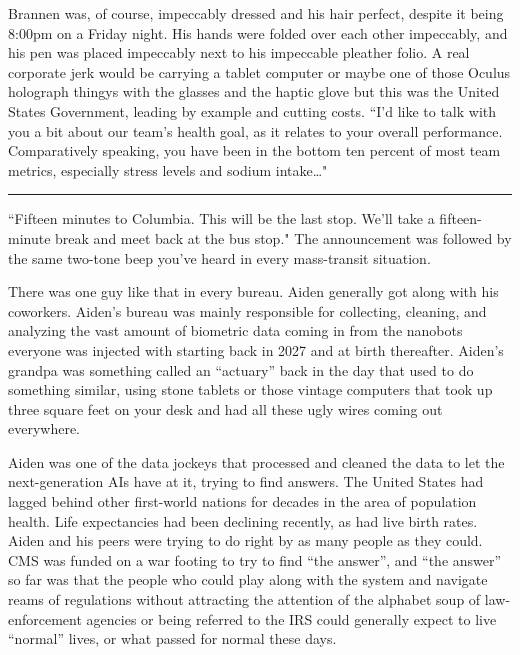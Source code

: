 \documentclass[11pt]{book}
\begin{document}
	Brannen was, of course, impeccably dressed and his hair perfect, despite it being 8:00pm on a Friday night. His hands were folded over each other impeccably, and his pen was placed impeccably next to his impeccable pleather folio. A real corporate jerk would be carrying a tablet computer or maybe one of those Oculus holograph thingys with the glasses and the haptic glove but this was the United States Government, leading by example and cutting costs. ``I'd like to talk with you a bit about our team’s health goal, as it relates to your overall performance. Comparatively speaking, you have been in the bottom ten percent of most team metrics, especially stress levels and sodium intake\dots"

	\vspace{0.5cm}
	\hrule
	\vspace{0.5cm}
	
	``Fifteen minutes to Columbia. This will be the last stop. We'll take a fifteen-minute break and meet back at the bus stop." The announcement was followed by the same two-tone beep you've heard in every mass-transit situation.
	
	There was one guy like that in every bureau. Aiden generally got along with his coworkers. Aiden's bureau was mainly responsible for collecting, cleaning, and analyzing the vast amount of biometric data coming in from the nanobots everyone was injected with starting back in 2027 and at birth thereafter. Aiden's grandpa was something called an ``actuary'' back in the day that used to do something similar, using stone tablets or those vintage computers that took up three square feet on your desk and had all these ugly wires coming out everywhere.
	
	Aiden was one of the data jockeys that processed and cleaned the data to let the next-generation AIs have at it, trying to find answers. The United States had lagged behind other first-world nations for decades in the area of population health. Life expectancies had been declining recently, as had live birth rates. Aiden and his peers were trying to do right by as many people as they could. CMS was funded on a war footing to try to find ``the answer'', and ``the answer'' so far was that the people who could play along with the system and navigate reams of regulations without attracting the attention of the alphabet soup of law-enforcement agencies or being referred to the IRS could generally expect to live ``normal'' lives, or what passed for normal these days.
	
\end{document}
